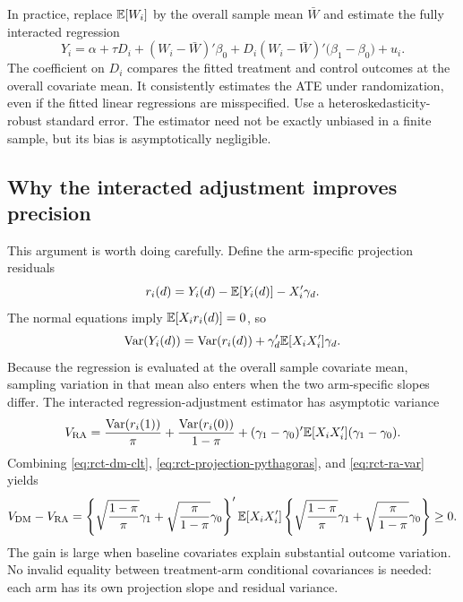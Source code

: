 In practice, replace $\mathbb{E}[W_i]$ by the overall sample mean $\bar W$ and estimate
the fully interacted regression
\begin{equation}
  Y_i=\alpha+\tau D_i+(W_i-\bar W)'\beta_0
      +D_i(W_i-\bar W)'\bigl(\beta_1-\beta_0\bigr)+u_i.
  \label{eq:rct-lin-reg}
\end{equation}
The coefficient on $D_i$ compares the fitted treatment and control outcomes at the
overall covariate mean.  It consistently estimates the ATE under randomization,
even if the fitted linear regressions are misspecified.  Use a
heteroskedasticity-robust standard error.  The estimator need not be exactly unbiased
in a finite sample, but its bias is asymptotically negligible.

\subsection{Why the interacted adjustment improves precision}

This argument is worth doing carefully.  Define the arm-specific projection
residuals
\[
  r_i(d)=Y_i(d)-\mathbb{E}[Y_i(d)]-X_i'\gamma_d.
\]
The normal equations imply $\mathbb{E}[X_i r_i(d)]=0$, so
\begin{equation}
  \operatorname{Var}(Y_i(d))=\operatorname{Var}(r_i(d))+\gamma_d'\mathbb{E}[X_iX_i']\gamma_d.
  \label{eq:rct-projection-pythagoras}
\end{equation}
Because the regression is evaluated at the overall sample covariate mean, sampling
variation in that mean also enters when the two arm-specific slopes differ.  The
interacted regression-adjustment estimator has asymptotic variance
\begin{equation}
  V_{\mathrm{RA}}
  =\frac{\operatorname{Var}(r_i(1))}{\pi}
   +\frac{\operatorname{Var}(r_i(0))}{1-\pi}
   +(\gamma_1-\gamma_0)'\mathbb{E}[X_iX_i'](\gamma_1-\gamma_0).
  \label{eq:rct-ra-var}
\end{equation}
Combining \eqref{eq:rct-dm-clt}, \eqref{eq:rct-projection-pythagoras}, and
\eqref{eq:rct-ra-var} yields
\begin{equation}
  V_{\mathrm{DM}}-V_{\mathrm{RA}}
  =\left\{
      \sqrt{\frac{1-\pi}{\pi}}\gamma_1
      +\sqrt{\frac{\pi}{1-\pi}}\gamma_0
    \right\}'
    \mathbb{E}[X_iX_i']
    \left\{
      \sqrt{\frac{1-\pi}{\pi}}\gamma_1
      +\sqrt{\frac{\pi}{1-\pi}}\gamma_0
    \right\}
  \geq 0.
  \label{eq:rct-efficiency-gain}
\end{equation}
The gain is large when baseline covariates explain substantial outcome variation.
No invalid equality between treatment-arm conditional covariances is needed: each
arm has its own projection slope and residual variance.

